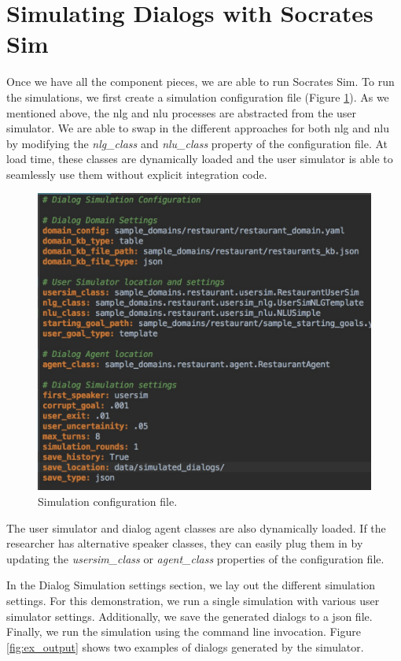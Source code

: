 \section{Simulating Dialogs with Socrates Sim}
Once we have all the component pieces, we are able to run Socrates Sim. To run the simulations, we first create a simulation configuration file (Figure \ref{fig:restaurant_sim_config }). As we mentioned above, the nlg and nlu processes are abstracted from the user simulator. We are able to swap in the different approaches for both nlg and nlu by modifying the \textit{nlg\_class} and \textit{nlu\_class} property of the configuration file. At load time, these classes are dynamically loaded and the user simulator is able to seamlessly use them without explicit integration code. 

\begin{figure}[h!]
	\centering
	\includegraphics[scale=.35]{diagrams/restaurant_sim_config.jpeg}
	\caption{ Simulation configuration file. }
	\label{fig:restaurant_sim_config }
\end{figure}

The user simulator and dialog agent classes are also dynamically loaded. If the researcher has alternative speaker classes, they can easily plug them in by updating the \textit{usersim\_class} or \textit{agent\_class} properties of the configuration file.

In the Dialog Simulation settings section, we lay out the different simulation settings. For this demonstration, we run a single simulation with various user simulator settings. Additionally, we save the generated dialogs to a json file. Finally, we run the simulation using the command line invocation. Figure \ref{fig:ex_output} shows two examples of dialogs generated by the simulator. 

